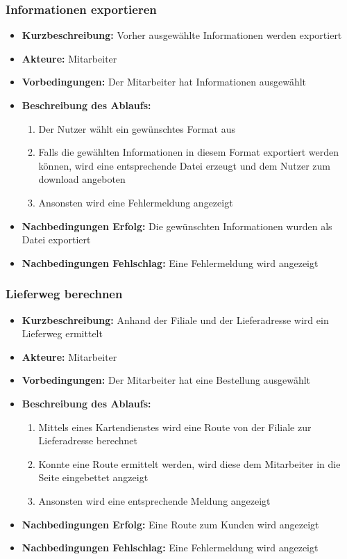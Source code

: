 \documentclass[a4paper]{report}
\begin{document}
\subsubsection*{Informationen exportieren}
\begin{itemize}
    \item \textbf{Kurzbeschreibung:} Vorher ausgewählte Informationen werden exportiert
    \item \textbf{Akteure:} Mitarbeiter
    \item \textbf{Vorbedingungen:} Der Mitarbeiter hat Informationen ausgewählt 
    \item \textbf{Beschreibung des Ablaufs:}
        \begin{enumerate}
            \item Der Nutzer wählt ein gewünschtes Format aus
            \item Falls die gewählten Informationen in diesem Format exportiert werden können, wird eine
                entsprechende Datei erzeugt und dem Nutzer zum download angeboten
            \item Ansonsten wird eine Fehlermeldung angezeigt
        \end{enumerate}
    \item \textbf{Nachbedingungen Erfolg:} Die gewünschten Informationen wurden als Datei exportiert
    \item \textbf{Nachbedingungen Fehlschlag:} Eine Fehlermeldung wird angezeigt 
\end{itemize}
%
\subsubsection*{Lieferweg berechnen}
\begin{itemize}
    \item \textbf{Kurzbeschreibung:} Anhand der Filiale und der Lieferadresse wird ein Lieferweg ermittelt
    \item \textbf{Akteure:} Mitarbeiter
    \item \textbf{Vorbedingungen:} Der Mitarbeiter hat eine Bestellung ausgewählt 
    \item \textbf{Beschreibung des Ablaufs:}
        \begin{enumerate}
            \item Mittels eines Kartendienstes wird eine Route von der Filiale zur Lieferadresse berechnet
            \item Konnte eine Route ermittelt werden, wird diese dem Mitarbeiter in die Seite eingebettet angzeigt
            \item Ansonsten wird eine entsprechende Meldung angezeigt
        \end{enumerate}
    \item \textbf{Nachbedingungen Erfolg:} Eine Route zum Kunden wird angezeigt
    \item \textbf{Nachbedingungen Fehlschlag:} Eine Fehlermeldung wird angezeigt 
\end{itemize}
\newpage
\end{document}

